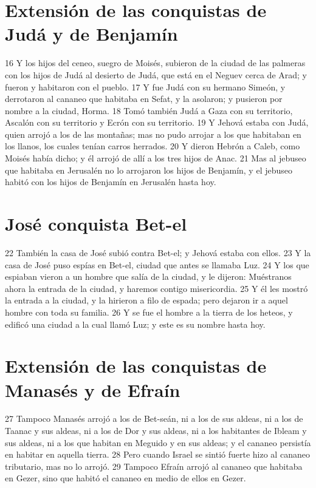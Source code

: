 \section*{Extensión de las conquistas de Judá y de Benjamín}

16 Y los hijos del ceneo, suegro de Moisés, subieron de la ciudad de las palmeras con los hijos de Judá al desierto de Judá, que está en el Neguev cerca de Arad; y fueron y habitaron con el pueblo.
17 Y fue Judá con su hermano Simeón, y derrotaron al cananeo que habitaba en Sefat, y la asolaron; y pusieron por nombre a la ciudad, Horma.
18 Tomó también Judá a Gaza con su territorio, Ascalón con su territorio y Ecrón con su territorio.
19 Y Jehová estaba con Judá, quien arrojó a los de las montañas; mas no pudo arrojar a los que habitaban en los llanos, los cuales tenían carros herrados.
20 Y dieron Hebrón a Caleb, como Moisés había dicho; y él arrojó de allí a los tres hijos de Anac. 
21 Mas al jebuseo que habitaba en Jerusalén no lo arrojaron los hijos de Benjamín, y el jebuseo habitó con los hijos de Benjamín en Jerusalén hasta hoy. 

\section*{José conquista Bet-el}

22 También la casa de José subió contra Bet-el; y Jehová estaba con ellos.
23 Y la casa de José puso espías en Bet-el, ciudad que antes se llamaba Luz.
24 Y los que espiaban vieron a un hombre que salía de la ciudad, y le dijeron: Muéstranos ahora la entrada de la ciudad, y haremos contigo misericordia.
25 Y él les mostró la entrada a la ciudad, y la hirieron a filo de espada; pero dejaron ir a aquel hombre con toda su familia.
26 Y se fue el hombre a la tierra de los heteos, y edificó una ciudad a la cual llamó Luz; y este es su nombre hasta hoy.

\section*{Extensión de las conquistas de Manasés y de Efraín}

27 Tampoco Manasés arrojó a los de Bet-seán, ni a los de sus aldeas, ni a los de Taanac y sus aldeas, ni a los de Dor y sus aldeas, ni a los habitantes de Ibleam y sus aldeas, ni a los que habitan en Meguido y en sus aldeas; y el cananeo persistía en habitar en aquella tierra.
28 Pero cuando Israel se sintió fuerte hizo al cananeo tributario, mas no lo arrojó. 
29 Tampoco Efraín arrojó al cananeo que habitaba en Gezer, sino que habitó el cananeo en medio de ellos en Gezer. 

